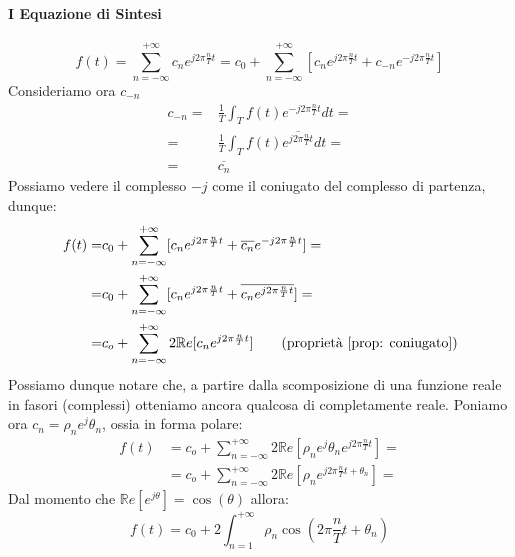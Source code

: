 \paragraph{I Equazione di Sintesi}\begin{equation*}
    f(t) = \sum_{n = -\infty}^{+\infty} c_n e^{j2\pi \frac{n}{T} t} = c_0 + \sum_{n = -\infty}^{+\infty}[ c_n e^{j2\pi \frac{n}{T} t} + c_{-n} e^{-j2\pi \frac{n}{T} t}] \tag{separo i $c_n$}
\end{equation*}
Consideriamo ora $c_{-n}$
\begin{align*}
    c_{-n} =& \frac{1}{T} \int_{T} f(t)e^{-j2\pi \frac{n}{T}t} dt = \\
    =& \frac{1}{T} \int_{T} f(t)\overline{e^{j2\pi \frac{n}{T}t}} dt = \\
    =& \overline{c_n}
\end{align*}
Possiamo vedere il complesso $-j$ come il coniugato del complesso di partenza, dunque:
\begin{align*}
    f(t) =& c_0 + \sum_{n = -\infty}^{+\infty}[ c_n e^{j2\pi \frac{n}{T} t} + \overline{c_{n}} e^{-j2\pi \frac{n}{T}t }] =\\
         =& c_0 + \sum_{n = -\infty}^{+\infty}[ c_n e^{j2\pi \frac{n}{T} t} + \overline{c_{n} e^{j2\pi \frac{n}{T}t} }] = \\
         =& c_o + \sum_{n = -\infty}^{+\infty} 2\mathbb{R}e [c_n e^{j2\pi \frac{n}{T}t}] \tag{proprietà \ref{prop: coniugato}}
\end{align*}
Possiamo dunque notare che, a partire dalla scomposizione di una funzione reale in fasori (complessi) otteniamo ancora qualcosa di completamente reale.
Poniamo ora $c_n = \rho_n e^j \theta_n$, ossia in forma polare:
\begin{align*}
    f(t) &= c_o + \sum_{n = -\infty}^{+\infty} 2\mathbb{R}e [\rho_n e^j \theta_n e^{j2\pi \frac{n}{T}t}] =\\
         &= c_o + \sum_{n = -\infty}^{+\infty} 2\mathbb{R}e [\rho_n e^{j2\pi \frac{n}{T}t +\theta_n }] =
\end{align*}
Dal momento che $\mathbb{R}e[e^{j\theta}] = \cos(\theta)$ allora:
\begin{equation}
    f(t) = c_0 + 2 \int_{n = 1}^{+\infty} \rho_n \cos\left(2\pi \frac{n}{T}t +\theta_n\right)
\end{equation}

